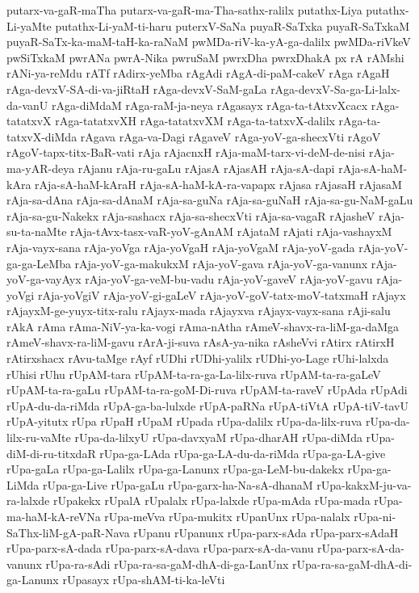 {putarx-va-gaR-maTha
putarx-va-gaR-ma-Tha-sathx-ralilx
putathx-Liya
putathx-Li-yaMte
putathx-Li-yaM-ti-haru
puterxV-SaNa
puyaR-SaTxka
puyaR-SaTxkaM
puyaR-SaTx-ka-maM-taH-ka-raNaM
pwMDa-riV-ka-yA-ga-dalilx
pwMDa-riVkeV
pwSiTxkaM
pwrANa
pwrA-Nika
pwruSaM
pwrxDha
pwrxDhakA
px
rA
rAMshi
rANi-ya-reMdu
rATf
rAdirx-yeMba
rAgAdi
rAgA-di-paM-cakeV
rAga
rAgaH
rAga-devxV-SA-di-va-jiRtaH
rAga-devxV-SaM-gaLa
rAga-devxV-Sa-ga-Li-lalx-da-vanU
rAga-diMdaM
rAga-raM-ja-neya
rAgasayx
rAga-ta-tAtxvXcacx
rAga-tatatxvX
rAga-tatatxvXH
rAga-tatatxvXM
rAga-ta-tatxvX-dalilx
rAga-ta-tatxvX-diMda
rAgava
rAga-va-Dagi
rAgaveV
rAga-yoV-ga-shecxVti
rAgoV
rAgoV-tapx-titx-BaR-vati
rAja
rAjacnxH
rAja-maM-tarx-vi-deM-de-nisi
rAja-ma-yAR-deya
rAjanu
rAja-ru-gaLu
rAjasA
rAjasAH
rAja-sA-dapi
rAja-sA-haM-kAra
rAja-sA-haM-kAraH
rAja-sA-haM-kA-ra-vapapx
rAjasa
rAjasaH
rAjasaM
rAja-sa-dAna
rAja-sa-dAnaM
rAja-sa-guNa
rAja-sa-guNaH
rAja-sa-gu-NaM-gaLu
rAja-sa-gu-Nakekx
rAja-sashacx
rAja-sa-shecxVti
rAja-sa-vagaR
rAjasheV
rAja-su-ta-naMte
rAja-tAvx-tasx-vaR-yoV-gAnAM
rAjataM
rAjati
rAja-vashayxM
rAja-vayx-sana
rAja-yoVga
rAja-yoVgaH
rAja-yoVgaM
rAja-yoV-gada
rAja-yoV-ga-ga-LeMba
rAja-yoV-ga-makukxM
rAja-yoV-gava
rAja-yoV-ga-vanunx
rAja-yoV-ga-vayAyx
rAja-yoV-ga-veM-bu-vadu
rAja-yoV-gaveV
rAja-yoV-gavu
rAja-yoVgi
rAja-yoVgiV
rAja-yoV-gi-gaLeV
rAja-yoV-goV-tatx-moV-tatxmaH
rAjayx
rAjayxM-ge-yuyx-titx-ralu
rAjayx-mada
rAjayxva
rAjayx-vayx-sana
rAji-salu
rAkA
rAma
rAma-NiV-ya-ka-vogi
rAma-nAtha
rAmeV-shavx-ra-liM-ga-daMga
rAmeV-shavx-ra-liM-gavu
rArA-ji-suva
rAsA-ya-nika
rAsheVvi
rAtirx
rAtirxH
rAtirxshacx
rAvu-taMge
rAyf
rUDhi
rUDhi-yalilx
rUDhi-yo-Lage
rUhi-lalxda
rUhisi
rUhu
rUpAM-tara
rUpAM-ta-ra-ga-La-lilx-ruva
rUpAM-ta-ra-gaLeV
rUpAM-ta-ra-gaLu
rUpAM-ta-ra-goM-Di-ruva
rUpAM-ta-raveV
rUpAda
rUpAdi
rUpA-du-da-riMda
rUpA-ga-ba-lulxde
rUpA-paRNa
rUpA-tiVtA
rUpA-tiV-tavU
rUpA-yitutx
rUpa
rUpaH
rUpaM
rUpada
rUpa-dalilx
rUpa-da-lilx-ruva
rUpa-da-lilx-ru-vaMte
rUpa-da-lilxyU
rUpa-davxyaM
rUpa-dharAH
rUpa-diMda
rUpa-diM-di-ru-titxdaR
rUpa-ga-LAda
rUpa-ga-LA-du-da-riMda
rUpa-ga-LA-give
rUpa-gaLa
rUpa-ga-Lalilx
rUpa-ga-Lanunx
rUpa-ga-LeM-bu-dakekx
rUpa-ga-LiMda
rUpa-ga-Live
rUpa-gaLu
rUpa-garx-ha-Na-sA-dhanaM
rUpa-kakxM-ju-va-ra-lalxde
rUpakekx
rUpalA
rUpalalx
rUpa-lalxde
rUpa-mAda
rUpa-mada
rUpa-ma-haM-kA-reVNa
rUpa-meVva
rUpa-mukitx
rUpanUnx
rUpa-nalalx
rUpa-ni-SaThx-liM-gA-paR-Nava
rUpanu
rUpanunx
rUpa-parx-sAda
rUpa-parx-sAdaH
rUpa-parx-sA-dada
rUpa-parx-sA-dava
rUpa-parx-sA-da-vanu
rUpa-parx-sA-da-vanunx
rUpa-ra-sAdi
rUpa-ra-sa-gaM-dhA-di-ga-LanUnx
rUpa-ra-sa-gaM-dhA-di-ga-Lanunx
rUpasayx
rUpa-shAM-ti-ka-leVti
}

